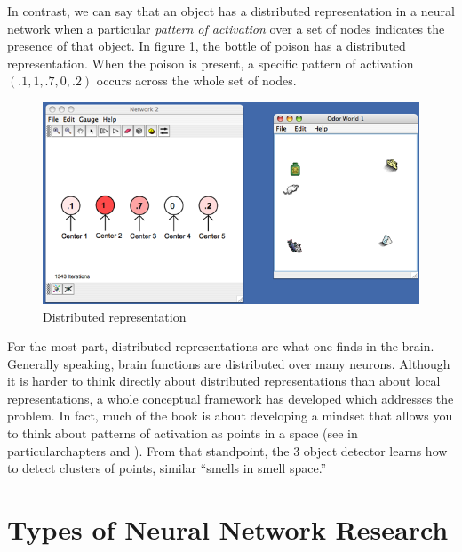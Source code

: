 In contrast, we can say that an object has a distributed representation in a neural network when a particular {\em pattern of activation} over a set of nodes indicates the presence of that object. In figure \ref{distributed},  the bottle of poison has a distributed representation. When the poison is present, a specific pattern of activation $(.1,1,.7,0,.2)$ occurs across the whole set of nodes.

\begin{figure}[h]
\centering
\includegraphics[scale=.3]{./images/Distributed_Rep.png}
\caption{Distributed representation}
\label{distributed}
\end{figure}

For the most part, distributed representations are what one finds in the brain. Generally speaking, brain functions are distributed over many neurons. Although it is harder to think directly about distributed representations than about local representations, a whole conceptual framework has developed which addresses the problem. In fact, much of the book is about developing a mindset that allows you to think about patterns of activation as points in a space (see in particularchapters  and ).  From that standpoint, the 3 object detector learns how to detect clusters of points, similar ``smells in smell space.'' 

\section{Types of Neural Network Research}\label{typesOfResearch}


